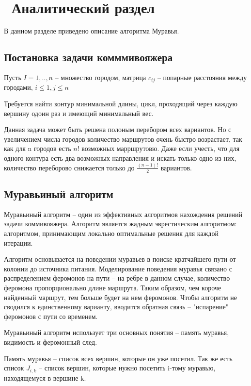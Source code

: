 \chapter{ Аналитический раздел}
\label{cha:analysis}
В данном разделе приведено описание алгоритма Муравья.

\section { Постановка задачи комммивояжера}

Пусть $I = {1, .., n}$ -- множество городом, матрица $c_{ij}$ -- попарные расстояния между городами, $i \leq 1, j \leq n$

Требуется найти контур минимальной длины, цикл, проходящий через каждую вершину одоин раз и имеющий минимальный вес.

Данная задача может быть решена полоным перебором всех вариантов. Но с увеличением числа городов количество маршрутов очень быстро возрастает, так как для n городов есть $n!$ возможных марршрутовю. Даже если учесть, что для одного контура есть два возможных направления и искать только одно из них, количество переборово снижается только до $\frac{(n-1)!}{2}$ вариантов.

\section { Муравьиный алгоритм}

Муравьиный алгоритм -- один из эффективных алгоритмов нахождения решений задачи коммивояжера. Алгоритм является жадным эврестическим алгоритмом: алгоритмом, принимающим локально оптимальные решения для каждой итерации.

Алгоритм основывается на поведении муравьев в поиске кратчайшего пути от колонии до источника питания. Моделирование поведения муравья связано с распределением феромонов на пути -- на ребре в данном случае, количество феромона пропорционально длине маршрута. Таким образом, чем короче найденный маршрут, тем больше будет на нем феромонов. Чтобы алгоритм не сводился к единственному варианту, вводится обратная связь -- "испарение" феромонов с пути со временем.

Муравьиный алгоритм использует три основных понятия -- память муравья, видимость и феромонный след.

Память муравья -- список всех вершин, которые он уже посетил. Так же есть список $J_{i, k}$ -- список вершин, которые нужно посетить i-тому муравью, находящемуся в вершине k.

